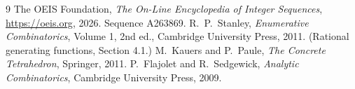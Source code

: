 \documentclass[11pt,a4paper]{article}
\theoremstyle{plain}
\theoremstyle{definition}
\begin{document}
\begin{thebibliography}{9}
 The OEIS Foundation, \emph{The On-Line Encyclopedia of Integer
Sequences}, \url{https://oeis.org}, 2026. Sequence A263869.
 R.~P.~Stanley, \emph{Enumerative Combinatorics}, Volume 1, 2nd ed.,
Cambridge University Press, 2011. (Rational generating functions, Section 4.1.)
 M.~Kauers and P.~Paule, \emph{The Concrete Tetrahedron}, Springer, 2011.
 P.~Flajolet and R.~Sedgewick, \emph{Analytic Combinatorics}, Cambridge
University Press, 2009.
\end{thebibliography}
\end{document}
